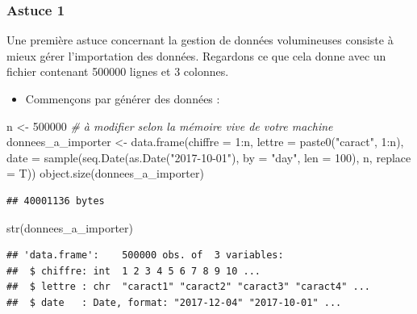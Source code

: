 \documentclass[
]{book}
\newenvironment{Shaded}{\begin{snugshade}}{\end{snugshade}}
\newcommand{\AttributeTok}[1]{\textcolor[rgb]{0.77,0.63,0.00}{#1}}
\newcommand{\CommentTok}[1]{\textcolor[rgb]{0.56,0.35,0.01}{\textit{#1}}}
\newcommand{\DecValTok}[1]{\textcolor[rgb]{0.00,0.00,0.81}{#1}}
\newcommand{\FunctionTok}[1]{\textcolor[rgb]{0.00,0.00,0.00}{#1}}
\newcommand{\NormalTok}[1]{#1}
\newcommand{\OtherTok}[1]{\textcolor[rgb]{0.56,0.35,0.01}{#1}}
\newcommand{\SpecialCharTok}[1]{\textcolor[rgb]{0.00,0.00,0.00}{#1}}
\newcommand{\StringTok}[1]{\textcolor[rgb]{0.31,0.60,0.02}{#1}}
\providecommand{\tightlist}{%
  \setlength{\itemsep}{0pt}\setlength{\parskip}{0pt}}
\theoremstyle{definition}
\theoremstyle{definition}
\theoremstyle{definition}
\theoremstyle{definition}
\theoremstyle{remark}
\begin{document}
\hypertarget{astuce-1}{%
\subsubsection{Astuce 1}\label{astuce-1}}

Une première astuce concernant la gestion de données volumineuses consiste à mieux gérer l'importation des données. Regardons ce que cela donne avec un fichier contenant 500000 lignes et 3 colonnes.

\begin{itemize}
\tightlist
\item
  Commençons par générer des données :
\end{itemize}

\begin{Shaded}
\begin{Highlighting}[]
\NormalTok{n }\OtherTok{\textless{}{-}} \DecValTok{500000} \CommentTok{\# à modifier selon la mémoire vive de votre machine}
\NormalTok{donnees\_a\_importer }\OtherTok{\textless{}{-}} \FunctionTok{data.frame}\NormalTok{(}\AttributeTok{chiffre =} \DecValTok{1}\SpecialCharTok{:}\NormalTok{n,}
 \AttributeTok{lettre =} \FunctionTok{paste0}\NormalTok{(}\StringTok{"caract"}\NormalTok{, }\DecValTok{1}\SpecialCharTok{:}\NormalTok{n), }
 \AttributeTok{date =} \FunctionTok{sample}\NormalTok{(}\FunctionTok{seq.Date}\NormalTok{(}\FunctionTok{as.Date}\NormalTok{(}\StringTok{"2017{-}10{-}01"}\NormalTok{), }\AttributeTok{by =} \StringTok{"day"}\NormalTok{, }\AttributeTok{len =} \DecValTok{100}\NormalTok{), n, }
               \AttributeTok{replace =}\NormalTok{ T))}
\FunctionTok{object.size}\NormalTok{(donnees\_a\_importer)}
\end{Highlighting}
\end{Shaded}

\begin{verbatim}
## 40001136 bytes
\end{verbatim}

\begin{Shaded}
\begin{Highlighting}[]
\FunctionTok{str}\NormalTok{(donnees\_a\_importer)}
\end{Highlighting}
\end{Shaded}

\begin{verbatim}
## 'data.frame':    500000 obs. of  3 variables:
##  $ chiffre: int  1 2 3 4 5 6 7 8 9 10 ...
##  $ lettre : chr  "caract1" "caract2" "caract3" "caract4" ...
##  $ date   : Date, format: "2017-12-04" "2017-10-01" ...
\end{verbatim}
\end{document}
